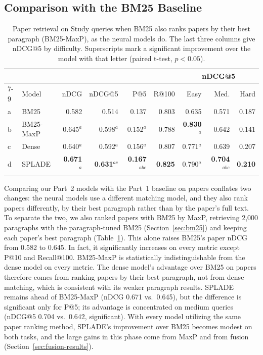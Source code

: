 \documentclass[sigconf,nonacm]{acmart}
\begin{document}
\subsection{Comparison with the BM25 Baseline}
\label{sec:vs-bm25}
\begin{table}[t]
  \caption{Paper retrieval on Study queries when BM25 also ranks papers
    by their best paragraph (BM25-MaxP), as the neural models do. The
    last three columns give nDCG@5 by difficulty. Superscripts mark a
    significant improvement over the model with that letter (paired
    t-test, $p < 0.05$).}
  \label{tab:maxp}
  \footnotesize
  \setlength{\tabcolsep}{3pt}
  \begin{tabular}{llrrrrrrr}
    \toprule
    & & & & & & \multicolumn{3}{c}{nDCG@5} \\
    \cmidrule(lr){7-9}
    & Model & nDCG & nDCG@5 & P@5 & R@100 & Easy & Med. & Hard \\
    \midrule
    a & BM25      & 0.582 & 0.514 & 0.137 & 0.803 & 0.635 & 0.571 & 0.187 \\
    b & BM25-MaxP & 0.645$^{a}$ & 0.598$^{a}$ & 0.152$^{a}$ & 0.788 & \textbf{0.830}$^{a}$ & 0.642 & 0.141 \\
    c & Dense     & 0.640$^{a}$ & 0.592$^{a}$ & 0.156$^{a}$ & 0.807 & 0.771$^{a}$ & 0.639 & 0.207 \\
    d & SPLADE    & \textbf{0.671}$^{a}$ & \textbf{0.631}$^{ac}$ & \textbf{0.167}$^{abc}$ & \textbf{0.825} & 0.790$^{a}$ & \textbf{0.704}$^{abc}$ & \textbf{0.210} \\
    \bottomrule
  \end{tabular}
\end{table}

Comparing our Part~2 models with the Part~1 baseline on papers conflates two 
changes: the neural models use a different matching model, and they also rank 
papers differently, by their best paragraph rather than by the paper's full text. 
To separate the two, we also ranked papers with BM25 by MaxP, retrieving 2,000 
paragraphs with the paragraph-tuned BM25 (Section~\ref{sec:bm25}) and keeping 
each paper's best paragraph (Table~\ref{tab:maxp}). This alone raises BM25's paper 
nDCG from 0.582 to 0.645. In fact, it significantly increases on every metric except 
P@10 and Recall@100. BM25-MaxP is statistically indistinguishable from the dense model 
on every metric. The dense model's advantage over BM25 on papers therefore 
comes from ranking papers by their best paragraph, not from dense matching, which 
is consistent with its weaker paragraph results. SPLADE remains ahead of BM25-MaxP 
(nDCG 0.671 vs.\ 0.645), but the difference is significant only for P@5; its advantage 
is concentrated on medium queries (nDCG@5 0.704 vs.\ 0.642, significant). With every 
model utilizing the same paper ranking method, SPLADE's improvement over BM25 becomes modest 
on both tasks, and the large gains in this phase come from MaxP and from fusion (Section~\ref{sec:fusion-results}).
\end{document}

